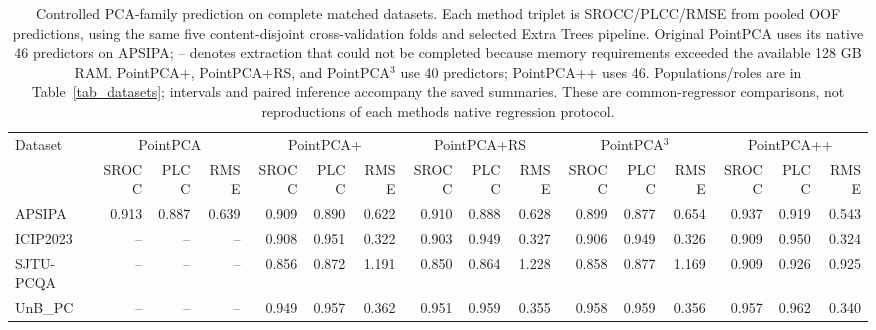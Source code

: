 \begin{table}[t!]
\centering
\caption{Controlled PCA-family prediction on complete matched datasets. Each method triplet is SROCC/PLCC/RMSE from pooled OOF predictions, using the same five content-disjoint cross-validation folds and selected Extra Trees pipeline. Original PointPCA uses its native 46 predictors on APSIPA; -- denotes extraction that could not be completed because memory requirements exceeded the available 128 GB RAM. PointPCA+, PointPCA+RS, and PointPCA$^3$ use 40 predictors; PointPCA++ uses 46. Populations/roles are in Table~\ref{tab_datasets}; intervals and paired inference accompany the saved summaries. These are common-regressor comparisons, not reproductions of each method\textquotesingle s native regression protocol.}
\label{tab_review_pca_family}
\scriptsize
\begin{adjustbox}{max width=\textwidth}
\begin{tabular}{lrrrrrrrrrrrrrrr}
\toprule
Dataset & \multicolumn{3}{c}{PointPCA} & \multicolumn{3}{c}{PointPCA+} & \multicolumn{3}{c}{PointPCA+RS} & \multicolumn{3}{c}{PointPCA$^3$} & \multicolumn{3}{c}{PointPCA++} \\
 & SROCC & PLCC & RMSE & SROCC & PLCC & RMSE & SROCC & PLCC & RMSE & SROCC & PLCC & RMSE & SROCC & PLCC & RMSE \\
\midrule
APSIPA & 0.913 & 0.887 & 0.639 & 0.909 & 0.890 & 0.622 & 0.910 & 0.888 & 0.628 & 0.899 & 0.877 & 0.654 & 0.937 & 0.919 & 0.543 \\
ICIP2023 & -- & -- & -- & 0.908 & 0.951 & 0.322 & 0.903 & 0.949 & 0.327 & 0.906 & 0.949 & 0.326 & 0.909 & 0.950 & 0.324 \\
SJTU-PCQA & -- & -- & -- & 0.856 & 0.872 & 1.191 & 0.850 & 0.864 & 1.228 & 0.858 & 0.877 & 1.169 & 0.909 & 0.926 & 0.925 \\
UnB\_PC & -- & -- & -- & 0.949 & 0.957 & 0.362 & 0.951 & 0.959 & 0.355 & 0.958 & 0.959 & 0.356 & 0.957 & 0.962 & 0.340 \\
\bottomrule
\end{tabular}
\end{adjustbox}
\end{table}
